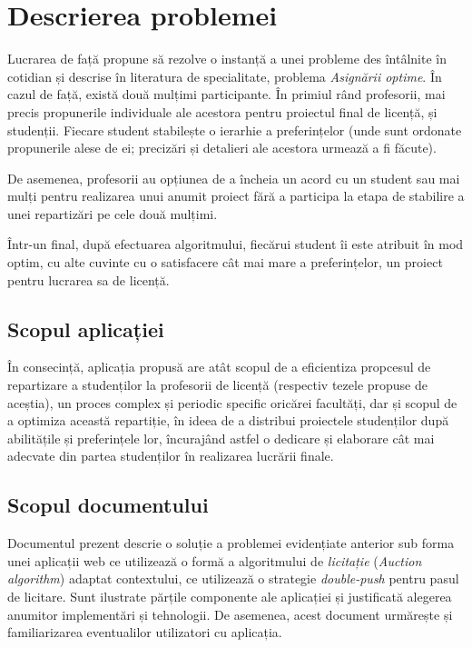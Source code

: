 \chapter{Descrierea problemei}
Lucrarea de față propune să rezolve o instanță a unei probleme des întâlnite în cotidian și descrise în literatura de specialitate, problema \textit{Asignării optime}. În cazul de față, există două mulțimi participante. În primiul rând profesorii, mai precis propunerile individuale ale acestora pentru proiectul final de licență, și studenții. Fiecare student stabilește o ierarhie a preferințelor (unde sunt ordonate propunerile alese de ei; precizări și detalieri ale acestora urmează a fi făcute).

De asemenea, profesorii au opțiunea de a încheia un acord cu un student sau mai mulți pentru realizarea unui anumit proiect fără a participa la etapa de stabilire a unei repartizări pe cele două mulțimi.

Într-un final, după efectuarea algoritmului, fiecărui student îi este atribuit în mod optim, cu alte cuvinte cu o satisfacere cât mai mare a preferințelor, un proiect pentru lucrarea sa de licență.

\section{Scopul aplicației}

În consecință, aplicația propusă are atât scopul de a eficientiza propcesul de repartizare a studenților la profesorii de licență (respectiv tezele propuse de aceștia), un proces complex și periodic specific oricărei facultăți, dar și scopul de a optimiza această repartiție, în ideea de a distribui proiectele studenților după abilitățile și preferințele lor, încurajând astfel o dedicare și elaborare cât mai adecvate din partea studenților în realizarea lucrării finale.

\section{Scopul documentului}

Documentul prezent descrie o soluție a problemei evidențiate anterior sub forma unei aplicații web ce utilizează o formă a algoritmului de \textit{licitație} (\textit{Auction algorithm}) adaptat contextului, ce utilizează o strategie \textit{double-push} pentru pasul de licitare. Sunt ilustrate părțile componente ale aplicației și justificată alegerea anumitor implementări și tehnologii. De asemenea, acest document urmărește și familiarizarea eventualilor utilizatori cu aplicația.

